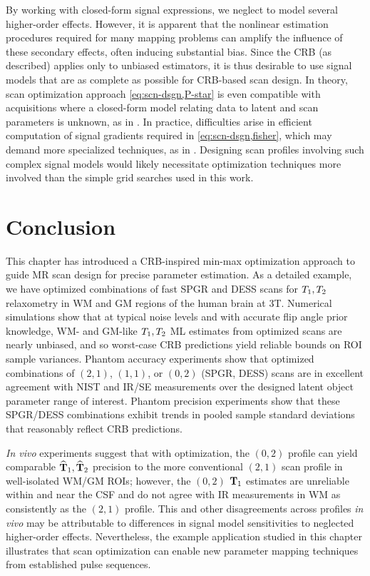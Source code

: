 By working with closed-form signal expressions, 
we neglect to model several higher-order effects.
However, it is apparent 
that the nonlinear estimation procedures required 
for many mapping problems can amplify the influence 
of these secondary effects, 
often inducing substantial bias. 
Since the CRB (as described) 
applies only to unbiased estimators, 
it is thus desirable to use signal models 
that are as complete as possible 
for CRB-based scan design.
In theory, scan optimization approach \eqref{eq:scn-dsgn,P-star} 
is even compatible with acquisitions 
where a closed-form model relating data 
to latent and scan parameters is unknown, 
as in \cite{beneliezer:15:raa, ma:13:mrf}. 
In practice, difficulties arise in efficient computation 
of signal gradients required in \eqref{eq:scn-dsgn,fisher},
which may demand more specialized techniques, 
as in \cite{zhao:16:oed}.
Designing scan profiles involving such complex signal models 
would likely necessitate optimization techniques more involved 
than the simple grid searches used in this work.

\section{Conclusion}
\label{s,scn-dsgn,conc}

This chapter has introduced 
a CRB-inspired min-max optimization approach 
to guide MR scan design 
for precise parameter estimation. 
As a detailed example, 
we have optimized combinations 
of fast SPGR and DESS scans 
for $T_1, T_2$ relaxometry 
in WM and GM regions of the human brain at 3T. 
Numerical simulations show that at typical noise levels 
and with accurate flip angle prior knowledge, 
WM- and GM-like $T_1, T_2$ ML estimates 
from optimized scans are nearly unbiased,
and so worst-case CRB predictions 
yield reliable bounds on ROI sample variances.
Phantom accuracy experiments show that optimized combinations 
of $(2,1)$, $(1,1)$, or $(0,2)$ (SPGR, DESS) scans 
are in excellent agreement with NIST and IR/SE measurements 
over the designed latent object parameter range of interest.
Phantom precision experiments show 
that these SPGR/DESS combinations exhibit trends 
in pooled sample standard deviations 
that reasonably reflect CRB predictions.

\emph{In vivo} experiments suggest that with optimization, 
the $(0,2)$ profile can yield comparable $\widehat{\mathbf{T}}_1, \widehat{\mathbf{T}}_2$ precision 
to the more conventional $(2,1)$ \cite{nataraj:14:mbe} scan profile 
in well-isolated WM/GM ROIs; 
however, the $(0,2)$ $\mathbf{T}_1$ estimates are unreliable 
within and near the CSF
and do not agree with IR measurements 
in WM as consistently as the $(2,1)$ profile.
This and other disagreements across profiles \emph{in vivo} 
may be attributable to differences in signal model sensitivities 
to neglected higher-order effects. 
Nevertheless, the example application 
studied in this chapter illustrates 
that scan optimization can enable new parameter mapping techniques 
from established pulse sequences.
